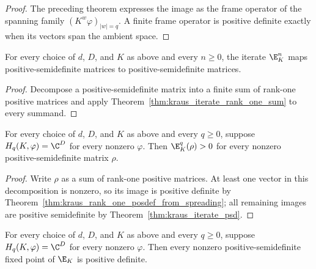 \begin{proof}\leanok
    The preceding theorem expresses the image as the frame operator of the
    spanning family $(K^w\varphi)_{|w|=q}$. A finite frame operator is positive
    definite exactly when its vectors span the ambient space.
\end{proof}

\begin{theorem}
    \label{thm:kraus_iterate_psd}
    \leanok
    For every choice of $d$, $D$, and $K$ as above and every $n\ge0$, the
    iterate $\E_K^n$ maps positive-semidefinite
    matrices to positive-semidefinite matrices.
\end{theorem}

\begin{proof}\leanok
    Decompose a positive-semidefinite matrix into a finite sum of rank-one
    positive matrices and apply Theorem~\ref{thm:kraus_iterate_rank_one_sum}
    to every summand.
\end{proof}

\begin{theorem}
    \label{thm:kraus_positivity_improving_from_spreading}
    \leanok
    For every choice of $d$, $D$, and $K$ as above and every $q\ge0$, suppose
    $H_q(K,\varphi)=\C^D$ for every nonzero $\varphi$.
    Then $\E_K^q(\rho)>0$ for every nonzero positive-semidefinite matrix
    $\rho$.
\end{theorem}

\begin{proof}\leanok
    Write $\rho$ as a sum of rank-one positive matrices. At least one vector
    in this decomposition is nonzero, so its image is positive definite by
    Theorem~\ref{thm:kraus_rank_one_posdef_from_spreading}; all remaining
    images are positive semidefinite by Theorem~\ref{thm:kraus_iterate_psd}.
\end{proof}

\begin{theorem}
    \label{thm:kraus_fixed_point_posdef_from_spreading}
    \leanok
    For every choice of $d$, $D$, and $K$ as above and every $q\ge0$, suppose
    $H_q(K,\varphi)=\C^D$ for every nonzero $\varphi$. Then every nonzero
    positive-semidefinite fixed point of $\E_K$ is positive definite.
\end{theorem}


